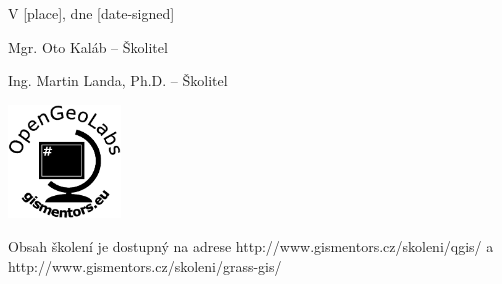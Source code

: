 \documentclass[12pt, a4paper]{letter}
\begin{document}
\vfill
\parbox{7cm}{

    V [place], dne [date-signed]\\

\vfill

    Mgr. Oto Kaláb -- Školitel\\

\vfill
    
    Ing. Martin Landa, Ph.D. -- Školitel

}
\hfill
\parbox{3cm}{
    \includegraphics[width=3cm]{../images/placka.eps}
}


\begin{center}
{\footnotesize Obsah školení je dostupný na adrese
http://www.gismentors.cz/skoleni/qgis/ a
http://www.gismentors.cz/skoleni/grass-gis/}
\end{center}
\end{document}
